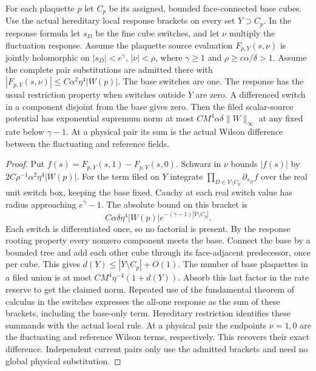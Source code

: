 \documentclass[11pt,letterpaper,reqno]{amsart}
\makeatletter
\numberwithin{equation}{section}
\theoremstyle{definition}
\newcommand{\ms@minorstart}{%
  \pushQED{\qed}\renewcommand{\qedsymbol}{$\blacksquare$}}
\newenvironment{lemma}[1][]{\ms@minorstart\ms@lemma[#1]}
  {\popQED\endms@lemma}
\theoremstyle{remark}
\makeatother
\begin{document}
\begin{samepage}
\begin{lemma}[Rooted localization of the Wilson insertion]
\label{si:lem-source-switches}
For each plaquette $p$ let $C_p$ be its assigned, bounded
face-connected base cubes. Use the
actual hereditary local response brackets on every set $Y\supset C_p$.
In the response formula let $s_D$ be the fine cube switches, and
let $\nu$ multiply the fluctuation response. Assume the plaquette
source evaluation $F_{p,Y}(s,\nu)$ is jointly holomorphic on
$|s_D|<e^\gamma$, $|\nu|<\rho$, where $\gamma\ge1$ and
$\rho\ge c\alpha/\delta>1$. Assume the complete pair substitutions
are admitted there with
$|F_{p,Y}(s,\nu)|\le C\alpha^2\eta^4|W(p)|$. The base switches are
one. The response has the usual restriction property when switches
outside $Y$ are zero. A differenced switch in a component disjoint
from the base gives zero. Then the filed scalar-source potential
has exponential supremum norm at most $CM^4\alpha\delta\|W\|_\infty$ at any fixed
rate below $\gamma-1$. At a physical pair its sum is the actual
Wilson difference between the fluctuating and reference fields.
\end{lemma}
\end{samepage}
\begin{proof}
Put $f(s)=F_{p,Y}(s,1)-F_{p,Y}(s,0)$. Schwarz in $\nu$ bounds
$|f(s)|$ by $2C\rho^{-1}\alpha^2\eta^4|W(p)|$. For the term filed
on $Y$ integrate $\prod_{D\in Y\setminus C_p}\partial_{s_D}f$
over the real unit switch box, keeping the base fixed. Cauchy at
each real switch value has radius approaching $e^\gamma-1$.
The absolute bound on this bracket is
\[
 C\alpha\delta\eta^4|W(p)|
                    e^{-(\gamma-1)|Y\setminus C_p|}.
\]
Each switch is differentiated once, so no factorial is present.
By the response rooting property every nonzero component meets
the base. Connect the base by a bounded tree and add each other
cube through its face-adjacent predecessor, once per cube. This
gives $d(Y)\le |Y\setminus C_p|+O(1)$.
The number of base plaquettes in a filed union is at most
$CM^4\eta^{-4}(1+d(Y))$. Absorb this last factor in the rate
reserve to get the claimed norm. Repeated use of the fundamental
theorem of calculus in the switches expresses the all-one
response as the sum of these brackets, including the base-only
term. Hereditary restriction identifies these summands with the
actual local rule. At a physical pair the endpoints $\nu=1,0$
are the fluctuating and reference Wilson terms, respectively.
This recovers their exact difference. Independent current pairs
only use the admitted brackets and need no global physical
substitution.
\end{proof}
\end{document}
